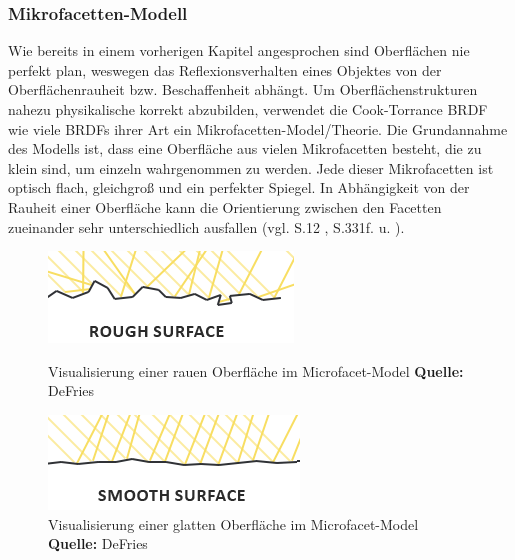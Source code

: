 \documentclass[
  11pt,
  a4paper,
  oneside
  ]{article}
\begin{document}
\subsubsection{Mikrofacetten-Modell }
Wie bereits in einem vorherigen Kapitel angesprochen sind Oberflächen nie perfekt plan, weswegen das Reflexionsverhalten eines Objektes von der Oberflächenrauheit bzw. Beschaffenheit abhängt. Um Oberflächenstrukturen nahezu physikalische korrekt abzubilden, verwendet die Cook-Torrance BRDF wie viele BRDFs ihrer Art ein Mikro\-facetten-Model/Theorie. Die Grundannahme des Modells ist, dass eine Oberfläche aus vielen Mikrofacetten besteht, die zu klein sind, um einzeln wahrgenommen zu werden. Jede dieser Mikrofacetten ist optisch flach, gleichgroß und ein perfekter Spiegel. In Abhängigkeit von der Rauheit einer Oberfläche kann die Orientierung zwischen den Facetten zueinander sehr unterschiedlich ausfallen 
(vgl. S.12 \cite{rtrPaper}, S.331f. \cite{realTimeRendering4th} u. \cite{learnOpenGL}).
\begin{figure}[H]
  \centering
  \begin{minipage}{.48\textwidth}
    \centering
    \includegraphics*[width=1\linewidth]{images/microfacets_light_rays1.png}
    \caption{Visualisierung einer rauen Oberfläche im Microfacet-Model \footnotesize\textbf{Quelle:} DeFries \cite{learnOpenGL}}
    \label{fig:img2_1}
  \end{minipage}%
  \hfill
  \begin{minipage}{.48\textwidth}
    \centering
    \includegraphics*[width=1\linewidth]{images/microfacets_light_rays2.png}
    \caption{Visualisierung einer glatten Oberfläche im Microfacet-Model \footnotesize\textbf{Quelle:} DeFries \cite{learnOpenGL}}
    \label{fig:img2_2}
  \end{minipage}
\end{figure}
\end{document}
